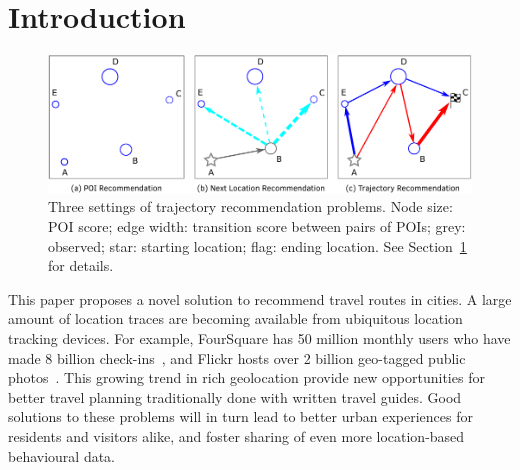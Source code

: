 
\section{Introduction}
\label{sec:intro}
\secmoveup

\begin{figure}[ht]
	\centering
	\includegraphics[width=\columnwidth]{fig/fig1-flavours.pdf}
	\caption{Three settings of trajectory recommendation problems.
Node size: POI score; edge width: transition score between pairs of POIs;
grey: observed;
star: starting location; flag: ending location. See Section~\ref{sec:intro} for details.
}
	\label{fig:threesettings}\captionmoveup
\end{figure}


This paper proposes a novel solution to recommend travel routes in cities.
A large amount of location traces are becoming available from ubiquitous location tracking devices.
For example, FourSquare
has 50 million monthly users who have made 8 billion check-ins~\cite{4sq},
and Flickr
hosts over 2 billion geo-tagged public photos~\cite{flickr}.
This growing trend in rich geolocation 
provide new opportunities for better
travel planning traditionally done with written travel guides.
Good solutions to these problems will in turn lead to better urban experiences for residents and visitors alike, and foster sharing of even more location-based behavioural data.

